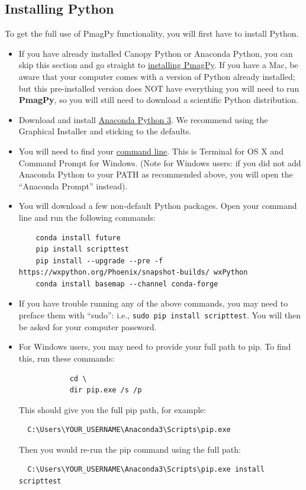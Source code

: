 \documentclass[11pt]{book}
\begin{document}
{\begin{itemize}
\subsection{Installing Python}

To get the full  use of PmagPy functionality, you will first have to install Python.


   \begin{itemize}
   \item If you have already installed Canopy Python or Anaconda Python, you can skip this section and go straight to \href{#pip_install}{installing PmagPy}.  If you have a Mac, be aware that your computer comes with a version of Python already installed; but this pre-installed version does NOT have everything you will need to run {\bf PmagPy}, so you will still need to download a scientific Python distribution.
   \item Download and install \href{https://www.continuum.io/downloads}{Anaconda Python 3}.  We recommend using the Graphical Installer and sticking to the defaults.
   \item You will need to find your \href{#command_line}{command line}.  This is Terminal for OS X and Command Prompt for Windows.  (Note for Windows users: if you did not add Anaconda Python to your PATH as recommended above, you will open the ``Anaconda Prompt'' instead).

   \item You will download a few non-default Python packages.  Open your command line and run the following commands: \begin{verbatim}
    conda install future
    pip install scripttest
    pip install --upgrade --pre -f https://wxpython.org/Phoenix/snapshot-builds/ wxPython
    conda install basemap --channel conda-forge
\end{verbatim}

   \item If you have trouble running any of the above commands, you may need to preface them with ``sudo'': i.e., \texttt{sudo pip install scripttest}.  You will then be asked for your computer password.
   \item For Windows users, you may need to provide your full path to pip.  To find this, run these commands: \begin{verbatim}
            cd \
            dir pip.exe /s /p \end{verbatim}
     This should give you the full pip path, for example: \begin{verbatim}
  C:\Users\YOUR_USERNAME\Anaconda3\Scripts\pip.exe
\end{verbatim}
     Then you would re-run the pip command using the full path: \begin{verbatim}
  C:\Users\YOUR_USERNAME\Anaconda3\Scripts\pip.exe install scripttest
  \end{verbatim}


\end{itemize}
\end{itemize}}
\end{document}
